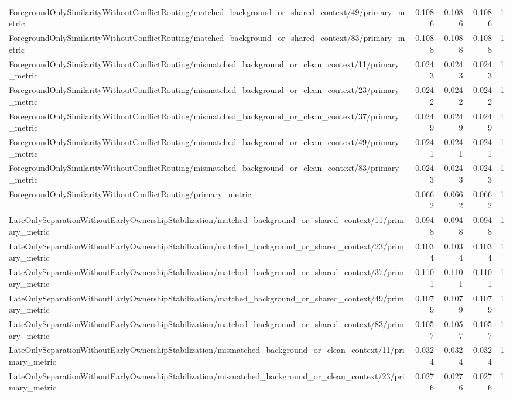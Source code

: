 \begin{table}[h]
\begin{tabular}{lrrrr}
ForegroundOnlySimilarityWithoutConflictRouting/matched_background_or_shared_context/49/primary_metric & 0.1086 & 0.1086 & 0.1086 & 1 \\
ForegroundOnlySimilarityWithoutConflictRouting/matched_background_or_shared_context/83/primary_metric & 0.1088 & 0.1088 & 0.1088 & 1 \\
ForegroundOnlySimilarityWithoutConflictRouting/mismatched_background_or_clean_context/11/primary_metric & 0.0243 & 0.0243 & 0.0243 & 1 \\
ForegroundOnlySimilarityWithoutConflictRouting/mismatched_background_or_clean_context/23/primary_metric & 0.0242 & 0.0242 & 0.0242 & 1 \\
ForegroundOnlySimilarityWithoutConflictRouting/mismatched_background_or_clean_context/37/primary_metric & 0.0249 & 0.0249 & 0.0249 & 1 \\
ForegroundOnlySimilarityWithoutConflictRouting/mismatched_background_or_clean_context/49/primary_metric & 0.0241 & 0.0241 & 0.0241 & 1 \\
ForegroundOnlySimilarityWithoutConflictRouting/mismatched_background_or_clean_context/83/primary_metric & 0.0243 & 0.0243 & 0.0243 & 1 \\
ForegroundOnlySimilarityWithoutConflictRouting/primary_metric & 0.0662 & 0.0662 & 0.0662 & 1 \\
LateOnlySeparationWithoutEarlyOwnershipStabilization/matched_background_or_shared_context/11/primary_metric & 0.0948 & 0.0948 & 0.0948 & 1 \\
LateOnlySeparationWithoutEarlyOwnershipStabilization/matched_background_or_shared_context/23/primary_metric & 0.1034 & 0.1034 & 0.1034 & 1 \\
LateOnlySeparationWithoutEarlyOwnershipStabilization/matched_background_or_shared_context/37/primary_metric & 0.1101 & 0.1101 & 0.1101 & 1 \\
LateOnlySeparationWithoutEarlyOwnershipStabilization/matched_background_or_shared_context/49/primary_metric & 0.1079 & 0.1079 & 0.1079 & 1 \\
LateOnlySeparationWithoutEarlyOwnershipStabilization/matched_background_or_shared_context/83/primary_metric & 0.1057 & 0.1057 & 0.1057 & 1 \\
LateOnlySeparationWithoutEarlyOwnershipStabilization/mismatched_background_or_clean_context/11/primary_metric & 0.0324 & 0.0324 & 0.0324 & 1 \\
LateOnlySeparationWithoutEarlyOwnershipStabilization/mismatched_background_or_clean_context/23/primary_metric & 0.0276 & 0.0276 & 0.0276 & 1 \\

\end{tabular}
\end{table}
